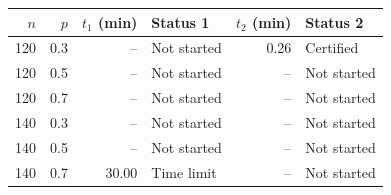 \begin{tabular}{rr rlr l}
\toprule
$n$ & $p$ & $t_1$ (min) & Status 1 & $t_2$ (min) & Status 2 \\
\midrule
120 & 0.3 & -- & Not started & 0.26 & Certified \\
120 & 0.5 & -- & Not started & -- & Not started \\
120 & 0.7 & -- & Not started & -- & Not started \\
140 & 0.3 & -- & Not started & -- & Not started \\
140 & 0.5 & -- & Not started & -- & Not started \\
140 & 0.7 & 30.00 & Time limit & -- & Not started \\
\bottomrule
\end{tabular}
